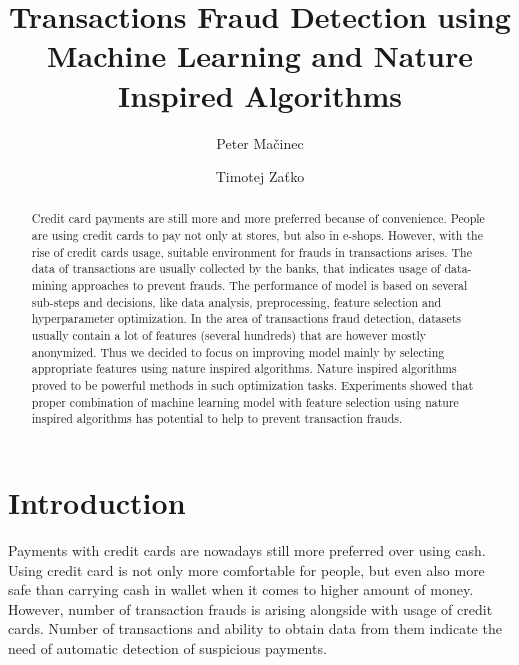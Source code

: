 \documentclass[runningheads]{llncs}
\begin{document}
%
\title{Transactions Fraud Detection using Machine Learning and Nature Inspired Algorithms}
%
%
\author{Peter Mačinec \and Timotej Zaťko}
%
%
%
\maketitle              %
%
\begin{abstract}
Credit card payments are still more and more preferred because of convenience. People are using credit cards to pay not only at stores, but also in e-shops. However, with the rise of credit cards usage, suitable environment for frauds in transactions arises. The data of transactions are usually collected by the banks, that indicates usage of data-mining approaches to prevent frauds. The performance of model is based on several sub-steps and decisions, like data analysis, preprocessing, feature selection and hyperparameter optimization. In the area of transactions fraud detection, datasets usually contain a lot of features (several hundreds) that are however mostly anonymized. Thus we decided to focus on improving model mainly by selecting appropriate features using nature inspired algorithms. Nature inspired algorithms proved to be powerful methods in such optimization tasks. Experiments showed that proper combination of machine learning model with feature selection using nature inspired algorithms has potential to help to prevent transaction frauds.

\end{abstract}
%
%
%
\section{Introduction}

Payments with credit cards are nowadays still more preferred over using cash. Using credit card is not only more comfortable for people, but even also more safe than carrying cash in wallet when it comes to higher amount of money. However, number of transaction frauds is arising alongside with usage of credit cards. Number of transactions and ability to obtain data from them indicate the need of automatic detection of suspicious payments.
\end{document}

